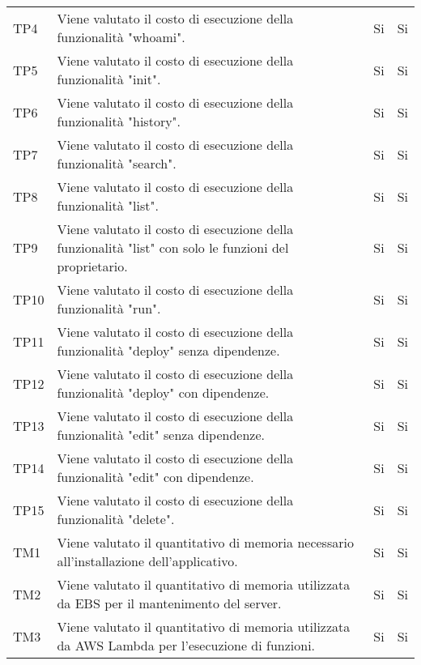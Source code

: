 \begin{longtable}{
		>{\centering}p{}
		>{}p{}
		>{\centering}p{}
		>{\centering}p{} }
		TP4 & Viene valutato il costo di esecuzione della funzionalità "whoami". &
		Si &
		Si \tabularnewline
		
		TP5 & Viene valutato il costo di esecuzione della funzionalità "init". &
		Si &
		Si \tabularnewline
		
		TP6 & Viene valutato il costo di esecuzione della funzionalità "history". &
		Si &
		Si \tabularnewline
		
		TP7 & Viene valutato il costo di esecuzione della funzionalità "search". &
		Si &
		Si \tabularnewline
		
		TP8 & Viene valutato il costo di esecuzione della funzionalità "list". &
		Si &
		Si \tabularnewline
		
		TP9 & Viene valutato il costo di esecuzione della funzionalità "list" con solo le funzioni del proprietario. &
		Si &
		Si \tabularnewline
		
		TP10 & Viene valutato il costo di esecuzione della funzionalità "run". &
		Si &
		Si \tabularnewline
		
		TP11 & Viene valutato il costo di esecuzione della funzionalità "deploy" senza dipendenze. &
		Si &
		Si \tabularnewline
		
		TP12 & Viene valutato il costo di esecuzione della funzionalità "deploy" con dipendenze. &
		Si &
		Si \tabularnewline
		
		TP13 & Viene valutato il costo di esecuzione della funzionalità "edit" senza dipendenze. &
		Si &
		Si \tabularnewline
		
		TP14 & Viene valutato il costo di esecuzione della funzionalità "edit" con dipendenze. &
		Si &
		Si \tabularnewline
		
		TP15 & Viene valutato il costo di esecuzione della funzionalità "delete". &
		Si &
		Si \tabularnewline
		
		
		
		
		
		
		
		TM1 & Viene valutato il quantitativo di memoria necessario all'installazione dell'applicativo. &
		Si &
		Si \tabularnewline
		
		TM2 & Viene valutato il quantitativo di memoria utilizzata da EBS per il mantenimento del server. &
		Si &
		Si \tabularnewline
		
		TM3 & Viene valutato il quantitativo di memoria utilizzata da AWS Lambda per l'esecuzione di funzioni. &
		Si &
		Si \tabularnewline
		





\end{longtable}

